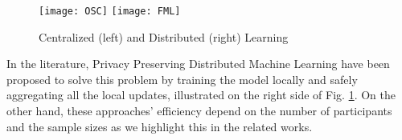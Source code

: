 \documentclass[USenglish,oneside,twocolumn]{article}
\theoremstyle{plain}
\begin{document}
    \vspace{-0.25cm}
    \begin{figure}[h]
        \centering
        \texttt{[image: OSC]}
        \texttt{[image: FML]}
        \caption{Centralized (left) and Distributed (right) Learning}
        \label{fig:ML}
    \end{figure}
    \vspace{-0.25cm}
    
    In the literature, Privacy Preserving Distributed Machine Learning \cite{pathak2010multiparty,rajkumar2012differentially,hamm2016learning,mcmahan2016communication,pawlick2016stackelberg} have been proposed to solve this problem by training the model locally and safely aggregating all the local updates, illustrated on the right side of Fig. \ref{fig:ML}. On the other hand, these approaches' efficiency depend on the number of participants and the sample sizes as we highlight this in the related works.
    
    
    
    
    
\end{document}
